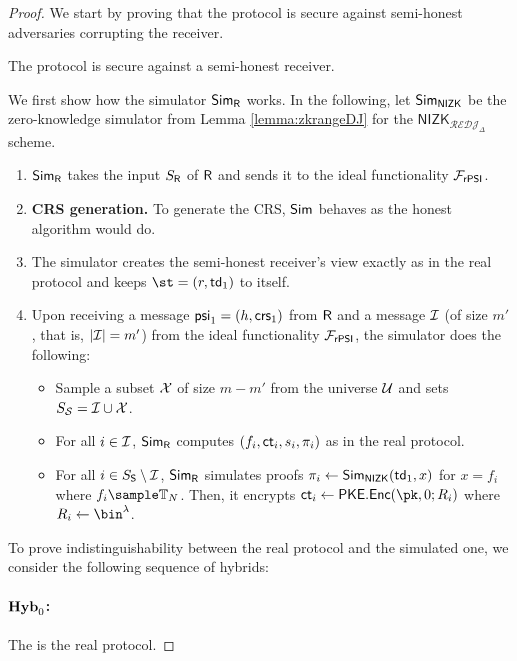 \begin{proof}
We start by proving that the protocol is secure against semi-honest adversaries corrupting the receiver.

\begin{lemma}
\label{lemma:SHreceiverLPSI}
The protocol is secure against a semi-honest receiver.
\end{lemma}

We first show how the simulator $\mathsf{Sim}_{\mathsf{R}}$ works.  In the following, let $\mathsf{Sim}_{\mathsf{NIZK}}$ be the zero-knowledge simulator from Lemma \ref{lemma:zkrangeDJ} for the $\mathsf{NIZK}_{\mathcal{REDJ}_\Delta}$ scheme.
\begin{enumerate}
    \item $\mathsf{Sim}_{\mathsf{R}}$ takes the input $S_{\mathsf{R}}$ of $\mathsf{R}$ and sends it to the ideal functionality $\mathcal{F}_\mathsf{rPSI}$.
    \item \textbf{CRS generation.} To generate the CRS, $\mathsf{Sim}$ behaves as the honest algorithm would do.
    \item The simulator creates the semi-honest receiver's view exactly as in the real protocol and keeps $\st=(r,\td_1)$ to itself.
    \item Upon receiving a message $\mathsf{psi}_1=(h,\mathsf{crs}_1)$ from $\mathsf{R}$ and a message $\mathcal{I}$ (of size $m'$, that is, $|\mathcal{I}|=m'$) from the ideal functionality $\mathcal{F}_{\mathsf{rPSI}}$, the simulator does the following:  
    \begin{itemize}
        \item Sample a subset $\mathcal{X}$ of size $m-m'$ from the universe $\mathcal{U}$ and sets $S_{\mathcal{S}}=\mathcal{I}\cup \mathcal{X}$.
        \item For all $i\in\mathcal{I}$, $\mathsf{Sim}_{\mathsf{R}}$ computes $(f_i,\mathsf{ct}_i,s_i,\pi_i)$ as in the real protocol.
        \item For all $i\in S_{\mathsf{S}}\setminus \mathcal{I}$, $\mathsf{Sim}_{\mathsf{R}}$ simulates proofs $\pi_i\leftarrow\mathsf{Sim}_\mathsf{NIZK}(\mathsf{td}_1,x)$ for $x=f_i$ where $f_i\sample \TT_N$. Then, it encrypts $\ct_i\leftarrow\mathsf{PKE.Enc}(\pk,0;R_i)$ where $R_i\leftarrow\bin^\lambda$.
    \end{itemize}
\end{enumerate}

To prove indistinguishability between the real protocol and the simulated one, we consider the following sequence of hybrids:

\paragraph{$\mathsf{\mathbf{Hyb}}_0$:} The is the real protocol.



\end{proof}

